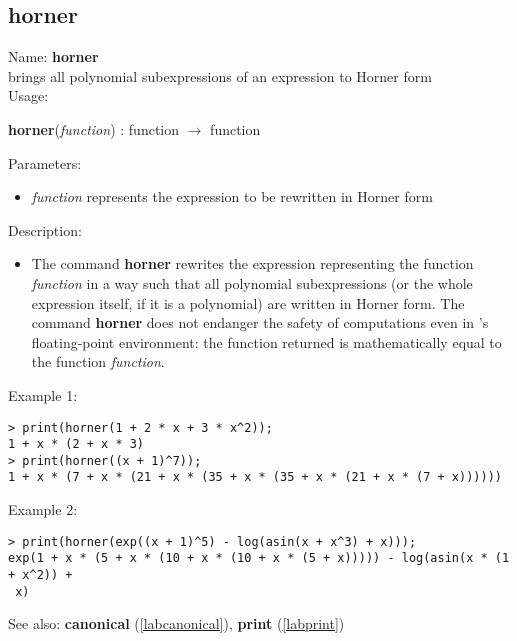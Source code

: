 \subsection{horner}
\label{labhorner}
\noindent Name: \textbf{horner}\\
brings all polynomial subexpressions of an expression to Horner form\\

\noindent Usage: 
\begin{center}
\textbf{horner}(\emph{function}) : \textsf{function} $\rightarrow$ \textsf{function}\\
\end{center}
Parameters: 
\begin{itemize}
\item \emph{function} represents the expression to be rewritten in Horner form
\end{itemize}
\noindent Description: \begin{itemize}

\item The command \textbf{horner} rewrites the expression representing the function
   \emph{function} in a way such that all polynomial subexpressions (or the
   whole expression itself, if it is a polynomial) are written in Horner
   form.  The command \textbf{horner} does not endanger the safety of
   computations even in \sollya's floating-point environment: the
   function returned is mathematically equal to the function \emph{function}.
\end{itemize}
\noindent Example 1: 
\begin{center}\begin{minipage}{15cm}\begin{Verbatim}[frame=single]
> print(horner(1 + 2 * x + 3 * x^2));
1 + x * (2 + x * 3)
> print(horner((x + 1)^7));
1 + x * (7 + x * (21 + x * (35 + x * (35 + x * (21 + x * (7 + x))))))
\end{Verbatim}
\end{minipage}\end{center}
\noindent Example 2: 
\begin{center}\begin{minipage}{15cm}\begin{Verbatim}[frame=single]
> print(horner(exp((x + 1)^5) - log(asin(x + x^3) + x)));
exp(1 + x * (5 + x * (10 + x * (10 + x * (5 + x))))) - log(asin(x * (1 + x^2)) +
 x)
\end{Verbatim}
\end{minipage}\end{center}
See also: \textbf{canonical} (\ref{labcanonical}), \textbf{print} (\ref{labprint})
